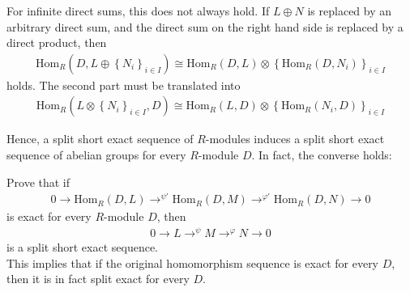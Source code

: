 \documentclass{memoir}
\begin{document}
\begin{rmrk}
	For infinite direct sums, this does not always hold. If \(L \oplus N\) is replaced by an arbitrary direct sum, and the direct sum on the right hand side is replaced by a direct product, then
	\begin{align*}
		\textrm{Hom}_R(D,L\oplus \left\{ N_i \right\}_{i \in I}) \cong \textrm{Hom}_R(D,L) \otimes \left\{ \textrm{Hom}_R(D,N_i) \right\}_{i \in I} 
	\end{align*}
	holds. The second part must be translated into
	\begin{align*}
		\textrm{Hom}_R(L \otimes \left\{ N_i \right\}_{i \in I},D) \cong \textrm{Hom}_R(L,D) \otimes \left\{ \textrm{Hom}_R(N_i,D) \right\}_{i \in I}
	\end{align*}
\end{rmrk}

Hence, a split short exact sequence of \(R\)-modules induces a split short exact sequence of abelian groups for every \(R\)-module \(D\). In fact, the converse holds:
\begin{hw}
	Prove that if
	\begin{align*}
		0 \to \textrm{Hom}_R(D,L) \to^{\psi '} \textrm{Hom}_R(D,M) \to^{\varphi'} \textrm{Hom}_R(D,N) \to 0
	\end{align*} is exact for every \(R\)-module \(D\), then
	\begin{align*}
		0 \to L \to^{\psi }M \to^{\varphi }N \to 0
	\end{align*}
	is a split short exact sequence.\\

	This implies that if the original homomorphism sequence is exact for every \(D\), then it is in fact split exact for every \(D\).
\end{hw}
\end{document}
